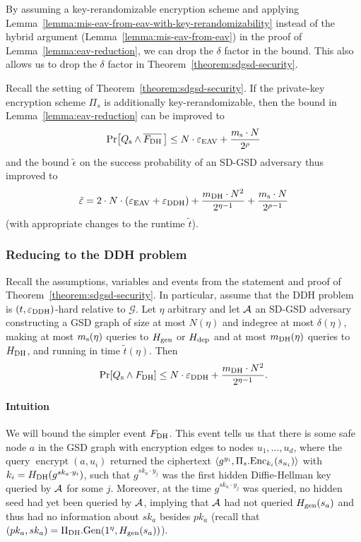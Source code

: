 By assuming a key-rerandomizable encryption scheme and applying Lemma~\vref{lemma:mis-eav-from-eav-with-key-rerandomizability} instead of the hybrid argument (Lemma~\ref{lemma:mis-eav-from-eav}) in the proof of Lemma~\ref{lemma:eav-reduction}, we can drop the $\delta$ factor in the bound. This also allows us to drop the $\delta$ factor in Theorem~\vref{theorem:sdgsd-security}.

\begin{corollary}
	Recall the setting of Theorem~\ref{theorem:sdgsd-security}. If the private-key encryption scheme $\Pi_s$ is additionally key-rerandomizable, then the bound in Lemma~\ref{lemma:eav-reduction} can be improved to
	\[
		\pr{\qs \land \overline{\fdh}\,} \le N \cdot \eeav + \frac{\ms \cdot N}{2^\rho}
	\]
	and the bound $\tilde{\epsilon}$ on the success probability of an SD-GSD adversary thus improved to
	\[
		\tilde{\varepsilon} = 2 \cdot N \cdot (\varepsilon_\mathrm{EAV} + \varepsilon_\mathrm{DDH}) + \frac{m_\mathrm{DH} \cdot N^2}{2^{\eta - 1}} + \frac{m_\mathrm{s} \cdot N}{2^{\rho - 1}}
	\]
	(with appropriate changes to the runtime $\tilde{t}$).
\end{corollary}


\subsubsection{Reducing to the DDH problem}

\begin{lemma} \label{lemma:dh-reduction}
	Recall the assumptions, variables and events from the statement and proof of Theorem~\ref{theorem:sdgsd-security}. In particular, assume that the DDH problem is $(t, \varepsilon_\mathrm{DDH})$-hard relative to $\mathcal{G}$. Let $\eta$ arbitrary and let $\mathcal{A}$ an SD-GSD adversary constructing a GSD graph of size at most $N(\eta)$ and indegree at most $\delta(\eta)$, making at most $m_\mathrm{s}(\eta)$ queries to $H_\mathrm{gen}$ or $H_\mathrm{dep}$ and at most $m_\mathrm{DH}(\eta)$ queries to $H_\mathrm{DH}$, and running in time $\tilde{t}(\eta)$. Then
	\[
		\pr{\qs \land \fdh} \le N \cdot \eddh + \frac{\mdh \cdot N^2}{2^{\eta - 1}}.
	\]
\end{lemma}

\paragraph{Intuition} We will bound the simpler event $F_\mathrm{DH}$. This event tells us that there is some safe node $a$ in the GSD graph with encryption edges to nodes $u_1, \ldots, u_d$, where the query $\operatorname{encrypt}(a, u_i)$ returned the ciphertext $\langle g^{y_i}, \Pi_s.\mathrm{Enc}_{k_i}(s_{u_i}) \rangle$ with $k_i = H_\mathrm{DH}(g^{sk_{a} \cdot y_i})$, such that $g^{sk_a \cdot y_j}$ was the first hidden Diffie-Hellman key queried by $\mathcal{A}$ for some $j$.
Moreover, at the time $g^{sk_a \cdot y_j}$ was queried, no hidden seed had yet been queried by $\mathcal{A}$, implying that $\mathcal{A}$ had not queried $H_\mathrm{gen}(s_a)$ and thus had no information about $sk_a$ besides $pk_a$ (recall that $(pk_a, sk_a) = \Pi_{\mathrm{DH}}.\mathrm{Gen}(1^\eta, H_\mathrm{gen}(s_a))$).

